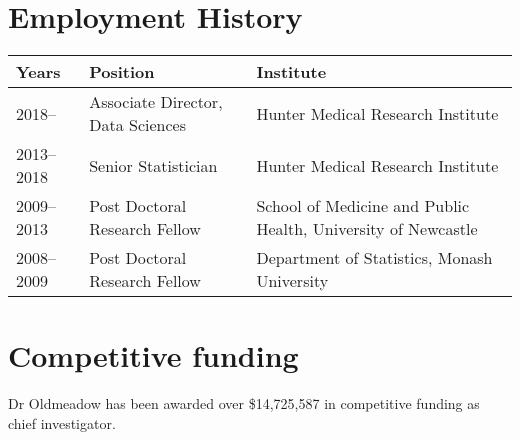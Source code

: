 \documentclass[11pt, a4paper]{awesome-cv}
\begin{document}
\begin{cventries}
    \vspace{-4.0mm}
    \vspace{-4.0mm}
\end{cventries}

\hypertarget{employment-history}{%
\section{Employment History}\label{employment-history}}

\begin{table}[H]
\centering
\begin{tabular}{lll}
\toprule
Years & Position & Institute\\
\midrule
\rowcolor{gray!6}  2018-- & Associate Director, Data Sciences & Hunter Medical Research Institute\\
2013--2018 & Senior Statistician & Hunter Medical Research Institute\\
\rowcolor{gray!6}  2009--2013 & Post Doctoral Research Fellow & School of Medicine and Public Health, University of Newcastle\\
2008--2009 & Post Doctoral Research Fellow & Department of Statistics, Monash University\\
\bottomrule
\end{tabular}
\end{table}

\hypertarget{competitive-funding}{%
\section{Competitive funding}\label{competitive-funding}}

Dr Oldmeadow has been awarded over \$14,725,587 in competitive funding
as chief investigator.
\end{document}
